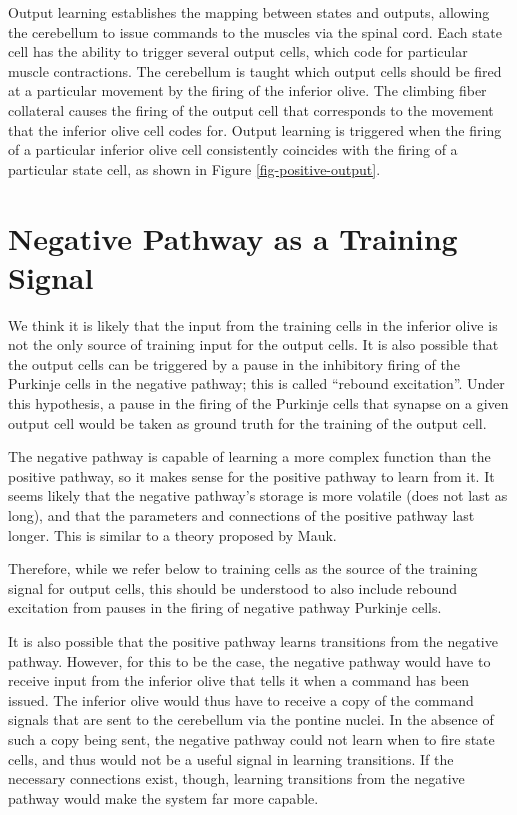 \documentclass{article}
\theoremstyle{definition}
\begin{document}
Output learning establishes the mapping between states and outputs,
allowing the cerebellum to issue commands to the muscles via the
spinal cord. Each state cell has the ability to trigger several output
cells, which code for particular muscle contractions. The cerebellum
is taught which output cells should be fired at a particular movement
by the firing of the inferior olive. The climbing fiber collateral
causes the firing of the output cell that corresponds to the movement
that the inferior olive cell codes for. Output learning is triggered
when the firing of a particular inferior olive cell consistently
coincides with the firing of a particular state cell, as shown in
Figure \ref{fig-positive-output}.

\section{Negative Pathway as a Training Signal}

We think it is likely that the input from the training cells in the
inferior olive is not the only source of training input for the output
cells. It is also possible that the output cells can be triggered by a
pause in the inhibitory firing of the Purkinje cells in the negative
pathway; this is called ``rebound excitation''. Under this hypothesis,
a pause in the firing of the Purkinje cells that synapse on a given
output cell would be taken as ground truth for the training of the
output cell.

The negative pathway is capable of learning a more complex function
than the positive pathway, so it makes sense for the positive pathway
to learn from it. It seems likely that the negative pathway's storage
is more volatile (does not last as long), and that the parameters and
connections of the positive pathway last longer. This is similar to a
theory proposed by Mauk.

Therefore, while we refer below to training cells as the source of the
training signal for output cells, this should be understood to also
include rebound excitation from pauses in the firing of negative
pathway Purkinje cells.

It is also possible that the positive pathway learns transitions from
the negative pathway. However, for this to be the case, the negative
pathway would have to receive input from the inferior olive that tells
it when a command has been issued. The inferior olive would thus have
to receive a copy of the command signals that are sent to the
cerebellum via the pontine nuclei. In the absence of such a copy being
sent, the negative pathway could not learn when to fire state cells,
and thus would not be a useful signal in learning transitions. If the
necessary connections exist, though, learning transitions from the
negative pathway would make the system far more capable.
\end{document}
